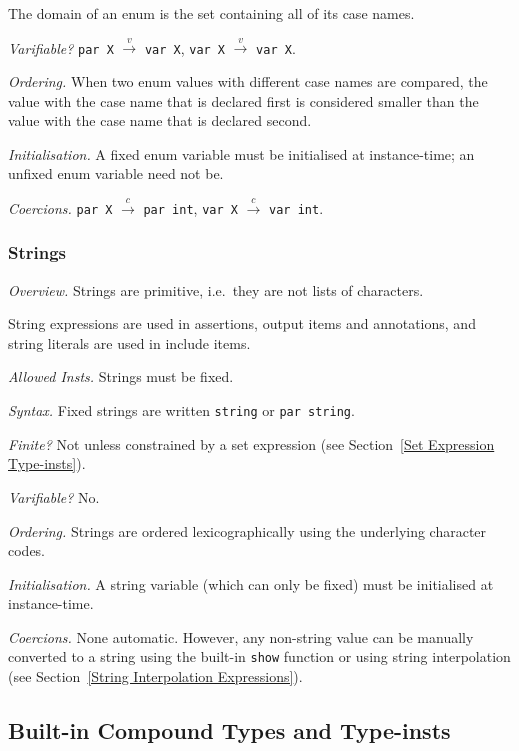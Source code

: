 \documentclass[10pt]{scrartcl}
\newcommand{\TyThing}[1]{\vspace{1.2mm}\noindent\emph{#1} }
\newcommand{\TyOverview}{\TyThing{Overview.}}
\newcommand{\TyInsts}{\TyThing{Allowed Insts.}}
\newcommand{\TySyntax}{\TyThing{Syntax.}}
\newcommand{\TyFiniteType}{\TyThing{Finite?}}
\newcommand{\TyVarifiable}{\TyThing{Varifiable?}}
\newcommand{\TyOrdering}{\TyThing{Ordering.}}
\newcommand{\TyInit}{\TyThing{Initialisation.}}
\newcommand{\TyCoercions}{\TyThing{Coercions.}}
\newcommand{\coerce}[2]{#1 $\stackrel{c}{\rightarrow}$ #2}
\newcommand{\varify}[2]{#1 $\stackrel{v}{\rightarrow}$ #2}
\begin{document}
The domain of an enum is the set containing all of its case names.

\TyVarifiable
\varify{\texttt{par X}}{\texttt{var X}},
\varify{\texttt{var X}}{\texttt{var X}}.

\TyOrdering
When two enum values with different case names are compared, the value with
the case name that is declared first is considered smaller than the value
with the case name that is declared second.

\TyInit
A fixed enum variable must be initialised at instance-time; an unfixed
enum variable need not be.

\TyCoercions
\coerce{\texttt{par X}}{\texttt{par int}}, \coerce{\texttt{var X}}{\texttt{var int}}.

\subsubsection{Strings}
\TyOverview
Strings are primitive, i.e.~they are not lists of characters.

String expressions are used in assertions, output items and
annotations, and string literals are used in include items.

\TyInsts
Strings must be fixed.

\TySyntax
Fixed strings are written \texttt{string} or \texttt{par string}.

\TyFiniteType
Not unless constrained by a set expression (see Section~\ref{Set Expression
Type-insts}).

\TyVarifiable
No.

\TyOrdering
Strings are ordered lexicographically using the underlying character codes.

\TyInit
A string variable (which can only be fixed) must be initialised at
instance-time.

\TyCoercions
None automatic.  However, any non-string value can be manually converted to
a string using the built-in \texttt{show} function or using string interpolation (see Section~\ref{String Interpolation Expressions}).

\subsection{Built-in Compound Types and Type-insts}
     \label{Built-in Compound Types}
\end{document}
